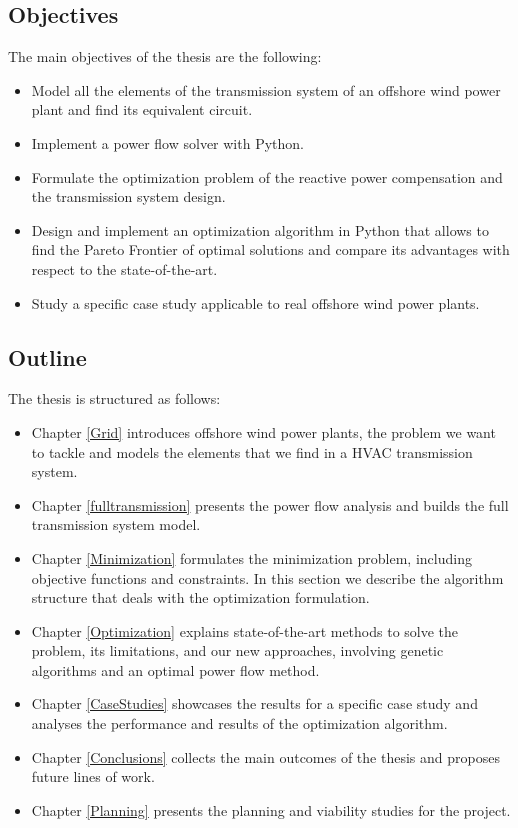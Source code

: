 \documentclass[a4paper,11pt, titlepage, twoside]{article}
\begin{document}
\subsection{Objectives}\label{objectives}

The main objectives of the thesis are the following:
\begin{itemize}
    \item Model all the elements of the transmission system of an offshore wind power plant and find its equivalent circuit.
    \item Implement a power flow solver with Python.
    \item Formulate the optimization problem of the reactive power compensation and the transmission system design. 
    \item Design and implement an optimization algorithm in Python that allows to find the Pareto Frontier of optimal solutions and compare its advantages with respect to the state-of-the-art.
    \item Study a specific case study applicable to real offshore wind power plants.
  \end{itemize}


\subsection{Outline}

The thesis is structured as follows:
\begin{itemize}
    \item Chapter \ref{Grid} introduces offshore wind power plants, the problem we want to tackle and models the elements that we find in a HVAC transmission system.
    \item Chapter \ref{fulltransmission} presents the power flow analysis and builds the full transmission system model. 
    \item Chapter \ref{Minimization}  formulates the minimization problem, including objective functions and constraints. In this section we describe
    the algorithm structure that deals with the optimization formulation.
    \item Chapter \ref{Optimization} explains state-of-the-art methods to solve the problem, its limitations, and our new approaches, involving
    genetic algorithms and  an optimal power flow method.
    \item Chapter \ref{CaseStudies} showcases  the results for a specific case study and analyses the performance and results of the optimization algorithm.
    \item Chapter \ref{Conclusions} collects the main outcomes of the thesis and proposes future lines of work.
    \item Chapter \ref{Planning} presents the planning and viability studies for the project.
\end{itemize}
\end{document}
